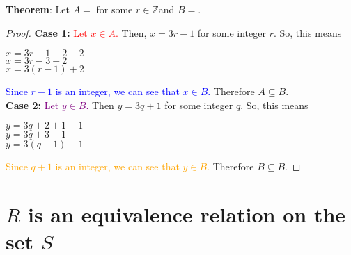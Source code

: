 \documentclass[11pt, oneside]{article}
\begin{document}
 \noindent \textbf{Theorem}:   Let $A=$ for some $r \in \mathbb{Z}$\textbraceright and $B=$\textbraceright.
 
 \begin{proof}
 
	\textbf{Case 1:}	\textcolor{red}{Let $x \in A$.}
		 Then, $x=3r-1$ for some integer $r$. So, this means
		 \begin{center}
		     $x=3r-1+2-2$\\
		     $x=3r-3+2$\\
		     $x=3(r-1)+2$\\
		 \end{center}
		\textcolor{blue}{Since $r-1$ is an integer, we can see that $x\in B$.}
	Therefore  $A \subseteq B$.\\
	\textbf{Case 2:} \textcolor{purple}{Let $y \in B$.} Then $y=3q+1$ for some integer $q$. So, this means
	\begin{center}
	    	$y=3q+2+1-1$\\
	    	$y=3q+3-1$\\
	    	$y=3(q+1)-1$
	    \end{center}
	    \textcolor{orange}{Since $q+1$ is an integer, we can see that $y\in B$.} Therefore $B\subseteq B$.
 \end{proof}
 
		 \newpage    

 
 \section{$R$ is an equivalence relation on the set $S$}
 
\end{document}
